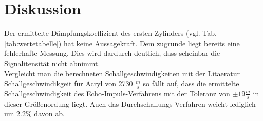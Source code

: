 \section{Diskussion}

Der ermittelte Dämpfungskoeffizient des ersten Zylinders (vgl. Tab. \ref{tab:wertetabelle}) hat keine Aussagekraft.
Dem zugrunde liegt bereits eine fehlerhafte Messung. Dies wird dardurch deutlich, dass scheinbar
die Signalitensität nicht abnimmt.\\

Vergleicht man die berechneten Schallgeschwindigkeiten mit der Litaeratur Schallgeschwindikgeit für Acryl
\cite{geschw} von 2730 $\frac{m}{s}$ so fällt auf, dass
die ermittelte Schallgeschwindigkeit des Echo-Impuls-Verfahrens mit der Toleranz von $\pm19\frac{m}{s}$
in dieser Größenordung liegt. Auch das Durchschallungs-Verfahren weicht lediglich um
$2.2\%$ davon ab.\\






\label{sec:Diskussion}